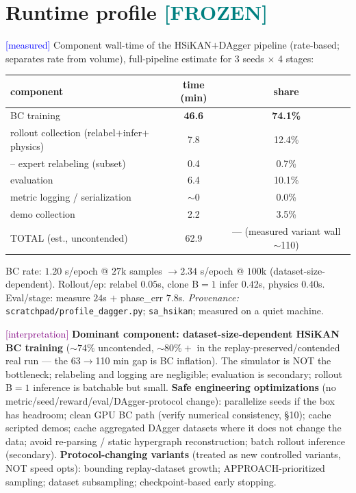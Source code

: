 \documentclass[11pt]{article}
\newcommand{\meas}{\textcolor{blue}{[measured]}}
\newcommand{\interp}{\textcolor{purple}{[interpretation]}}
\newcommand{\frozen}{\textcolor{teal}{\textbf{[FROZEN]}}}
\newcommand{\fn}[1]{\texttt{#1}}
\begin{document}
\section{Runtime profile \frozen}
\meas{} Component wall-time of the HSiKAN$+$DAgger pipeline (rate-based; separates rate from volume), full-pipeline
estimate for 3 seeds $\times$ 4 stages:
\begin{center}\begin{tabular}{lcc}
\toprule
component & time (min) & share\\
\midrule
BC training & \textbf{46.6} & \textbf{74.1\%}\\
rollout collection (relabel$+$infer$+$physics) & 7.8 & 12.4\%\\
\quad -- expert relabeling (subset) & 0.4 & 0.7\%\\
evaluation & 6.4 & 10.1\%\\
metric logging / serialization & $\sim0$ & 0.0\%\\
demo collection & 2.2 & 3.5\%\\
\midrule
TOTAL (est., uncontended) & 62.9 & --- (measured variant wall $\sim$110)\\
\bottomrule
\end{tabular}\end{center}
BC rate: $1.20$ s/epoch @ $27$k samples $\to 2.34$ s/epoch @ $100$k (dataset-size-dependent). Rollout/ep: relabel
$0.05$s, clone B$=1$ infer $0.42$s, physics $0.40$s. Eval/stage: measure $24$s $+$ phase\_err $7.8$s.
\emph{Provenance:} \fn{scratchpad/profile\_dagger.py}; \fn{sa\_hsikan}; measured on a quiet machine.

\interp{} \textbf{Dominant component: dataset-size-dependent HSiKAN BC training} ($\sim74\%$ uncontended,
$\sim80\%+$ in the replay-preserved/contended real run --- the 63$\to$110 min gap is BC inflation). The simulator
is NOT the bottleneck; relabeling and logging are negligible; evaluation is secondary; rollout B$=1$ inference is
batchable but small. \textbf{Safe engineering optimizations} (no metric/seed/reward/eval/DAgger-protocol change):
parallelize seeds if the box has headroom; clean GPU BC path (verify numerical consistency, \S10); cache scripted
demos; cache aggregated DAgger datasets where it does not change the data; avoid re-parsing / static hypergraph
reconstruction; batch rollout inference (secondary). \textbf{Protocol-changing variants} (treated as new
controlled variants, NOT speed opts): bounding replay-dataset growth; APPROACH-prioritized sampling; dataset
subsampling; checkpoint-based early stopping.
\end{document}
